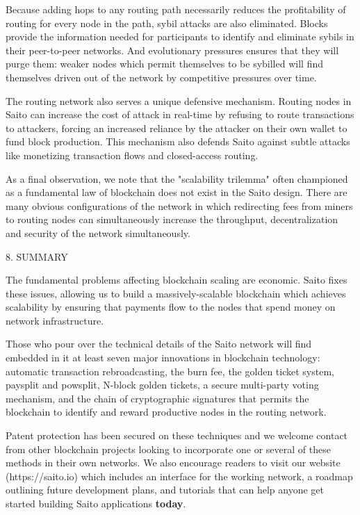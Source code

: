 \documentclass[11pt, oneside]{article}   	%
\begin{document}
\begin{multicols}{2}
Because adding hops to any routing path necessarily reduces the profitability of routing for every node in the path, sybil attacks are also eliminated. Blocks provide the information needed for participants to identify and eliminate sybils in their peer-to-peer networks. And evolutionary pressures ensures that they will purge them: weaker nodes which permit themselves to be sybilled will find themselves driven out of the network by competitive pressures over time.

The routing network also serves a unique defensive mechanism. Routing nodes in Saito can increase the cost of attack in real-time by refusing to route transactions to attackers, forcing an increased reliance by the attacker on their own wallet to fund block production. This mechanism also defends Saito against subtle attacks like monetizing transaction flows and closed-access routing.

As a final observation, we note that the "scalability trilemma" often championed as a fundamental law of blockchain does not exist in the Saito design. There are many obvious configurations of the network in which redirecting fees from miners to routing nodes can simultaneously increase the throughput, decentralization and security of the network simultaneously.


8. SUMMARY

The fundamental problems affecting blockchain scaling are economic. Saito fixes these issues, allowing us to build a massively-scalable blockchain which achieves scalability by ensuring that payments flow to the nodes that spend money on network infrastructure.

Those who pour over the technical details of the Saito network will find embedded in it at least seven major innovations in blockchain technology: automatic transaction rebroadcasting, the burn fee, the golden ticket system, paysplit and powsplit, N-block golden tickets, a secure multi-party voting mechanism, and the chain of cryptographic signatures that permits the blockchain to identify and reward productive nodes in the routing network.

Patent protection has been secured on these techniques and we welcome contact from other blockchain projects looking to incorporate one or several of these methods in their own networks. We also encourage readers to visit our website (https://saito.io) which includes an interface for the working network, a roadmap outlining future development plans, and tutorials that can help anyone get started building Saito applications \textbf{today}.

\end{multicols}
\end{document}

